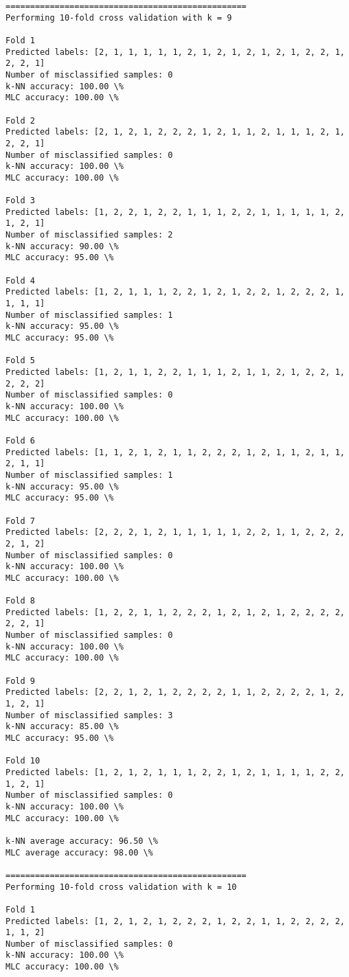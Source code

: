 \documentclass[11pt]{article}
\begin{document}
\begin{Verbatim}[commandchars=\\\{\}]
=================================================
Performing 10-fold cross validation with k = 9

Fold 1
Predicted labels: [2, 1, 1, 1, 1, 1, 2, 1, 2, 1, 2, 1, 2, 1, 2, 2, 1, 2, 2, 1]
Number of misclassified samples: 0
k-NN accuracy: 100.00 \%
MLC accuracy: 100.00 \%

Fold 2
Predicted labels: [2, 1, 2, 1, 2, 2, 2, 1, 2, 1, 1, 2, 1, 1, 1, 2, 1, 2, 2, 1]
Number of misclassified samples: 0
k-NN accuracy: 100.00 \%
MLC accuracy: 100.00 \%

Fold 3
Predicted labels: [1, 2, 2, 1, 2, 2, 1, 1, 1, 2, 2, 1, 1, 1, 1, 1, 2, 1, 2, 1]
Number of misclassified samples: 2
k-NN accuracy: 90.00 \%
MLC accuracy: 95.00 \%

Fold 4
Predicted labels: [1, 2, 1, 1, 1, 2, 2, 1, 2, 1, 2, 2, 1, 2, 2, 2, 1, 1, 1, 1]
Number of misclassified samples: 1
k-NN accuracy: 95.00 \%
MLC accuracy: 95.00 \%

Fold 5
Predicted labels: [1, 2, 1, 1, 2, 2, 1, 1, 1, 2, 1, 1, 2, 1, 2, 2, 1, 2, 2, 2]
Number of misclassified samples: 0
k-NN accuracy: 100.00 \%
MLC accuracy: 100.00 \%

Fold 6
Predicted labels: [1, 1, 2, 1, 2, 1, 1, 2, 2, 2, 1, 2, 1, 1, 2, 1, 1, 2, 1, 1]
Number of misclassified samples: 1
k-NN accuracy: 95.00 \%
MLC accuracy: 95.00 \%

Fold 7
Predicted labels: [2, 2, 2, 1, 2, 1, 1, 1, 1, 1, 2, 2, 1, 1, 2, 2, 2, 2, 1, 2]
Number of misclassified samples: 0
k-NN accuracy: 100.00 \%
MLC accuracy: 100.00 \%

Fold 8
Predicted labels: [1, 2, 2, 1, 1, 2, 2, 2, 1, 2, 1, 2, 1, 2, 2, 2, 2, 2, 2, 1]
Number of misclassified samples: 0
k-NN accuracy: 100.00 \%
MLC accuracy: 100.00 \%

Fold 9
Predicted labels: [2, 2, 1, 2, 1, 2, 2, 2, 2, 1, 1, 2, 2, 2, 2, 1, 2, 1, 2, 1]
Number of misclassified samples: 3
k-NN accuracy: 85.00 \%
MLC accuracy: 95.00 \%

Fold 10
Predicted labels: [1, 2, 1, 2, 1, 1, 1, 2, 2, 1, 2, 1, 1, 1, 1, 2, 2, 1, 2, 1]
Number of misclassified samples: 0
k-NN accuracy: 100.00 \%
MLC accuracy: 100.00 \%

k-NN average accuracy: 96.50 \%
MLC average accuracy: 98.00 \%

=================================================
Performing 10-fold cross validation with k = 10

Fold 1
Predicted labels: [1, 2, 1, 2, 1, 2, 2, 2, 1, 2, 2, 1, 1, 2, 2, 2, 2, 1, 1, 2]
Number of misclassified samples: 0
k-NN accuracy: 100.00 \%
MLC accuracy: 100.00 \%


\end{Verbatim}
\end{document}
